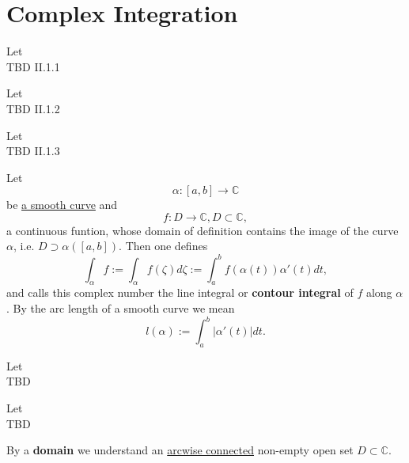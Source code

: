 \section{Complex Integration}


\begin{definition}[Curve]
    \label{sec:Curve}
    Let\\
    TBD II.1.1
\end{definition}


\begin{definition}
    \label{sec:SmoothCurve}
    Let\\
    TBD II.1.2
\end{definition}


\begin{definition}
    \label{sec:PiecewiseSmoothCurve}
    Let\\
    TBD II.1.3
\end{definition}


\begin{definition}
    \label{sec:ContourIntegral}
    Let
    $$\alpha : [a, b] \rightarrow \mathbb{C}$$
    be \hyperref[sec:SmoothCurve]{a smooth curve} and
    $$f: D \rightarrow \mathbb{C}, D \subset \mathbb{C},$$
    a continuous funtion, whose domain of definition contains the image of the curve $\alpha$,
    i.e. $D \supset \alpha([a,b]).$ Then one defines
    $$ \int_\alpha f:= \int_\alpha f(\zeta) d\zeta := \int_a^b f(\alpha(t))\alpha'(t)dt,$$
    and calls this complex number the line integral or \textbf{contour integral} of $f$ along $\alpha$.
    By the arc length of a smooth curve we mean
    $$l(\alpha):=\int_a^b |\alpha'(t)|dt.$$
\end{definition}


\begin{definition}
    \label{sec:PropContourIntegral}
    Let\\
    TBD
\end{definition}


\begin{definition}
    \label{sec:ArcwiseConnected}
    Let\\
    TBD
\end{definition}


\begin{definition}[Domain (II.2.3)]
    \label{sec:Domain}
    By a \textbf{domain} we understand an \hyperref[sec:ArcwiseConnected]{arcwise connected} non-empty open set $D \subset \mathbb{C}$.
\end{definition}


